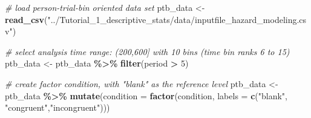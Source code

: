 \documentclass[
  man,floatsintext]{apa6}
\newenvironment{Shaded}{\begin{snugshade}}{\end{snugshade}}
\newcommand{\AttributeTok}[1]{\textcolor[rgb]{0.13,0.29,0.53}{#1}}
\newcommand{\CommentTok}[1]{\textcolor[rgb]{0.56,0.35,0.01}{\textit{#1}}}
\newcommand{\DecValTok}[1]{\textcolor[rgb]{0.00,0.00,0.81}{#1}}
\newcommand{\FunctionTok}[1]{\textcolor[rgb]{0.13,0.29,0.53}{\textbf{#1}}}
\newcommand{\NormalTok}[1]{#1}
\newcommand{\OtherTok}[1]{\textcolor[rgb]{0.56,0.35,0.01}{#1}}
\newcommand{\SpecialCharTok}[1]{\textcolor[rgb]{0.81,0.36,0.00}{\textbf{#1}}}
\newcommand{\StringTok}[1]{\textcolor[rgb]{0.31,0.60,0.02}{#1}}
\begin{document}
\scriptsize

\begin{Shaded}
\begin{Highlighting}[]
\CommentTok{\# load person{-}trial{-}bin oriented data set}
\NormalTok{ptb\_data }\OtherTok{\textless{}{-}} \FunctionTok{read\_csv}\NormalTok{(}\StringTok{"../Tutorial\_1\_descriptive\_stats/data/inputfile\_hazard\_modeling.csv"}\NormalTok{)}

\CommentTok{\# select analysis time range: (200,600] with 10 bins (time bin ranks 6 to 15)}
\NormalTok{ptb\_data }\OtherTok{\textless{}{-}}\NormalTok{ ptb\_data }\SpecialCharTok{\%\textgreater{}\%} \FunctionTok{filter}\NormalTok{(period }\SpecialCharTok{\textgreater{}} \DecValTok{5}\NormalTok{)}

\CommentTok{\# create factor condition, with "blank" as the reference level}
\NormalTok{ptb\_data }\OtherTok{\textless{}{-}}\NormalTok{ ptb\_data }\SpecialCharTok{\%\textgreater{}\%} \FunctionTok{mutate}\NormalTok{(}\AttributeTok{condition =} \FunctionTok{factor}\NormalTok{(condition, }\AttributeTok{labels =} \FunctionTok{c}\NormalTok{(}\StringTok{"blank"}\NormalTok{, }\StringTok{"congruent"}\NormalTok{,}\StringTok{"incongruent"}\NormalTok{)))}


\end{Highlighting}
\end{Shaded}
\end{document}
